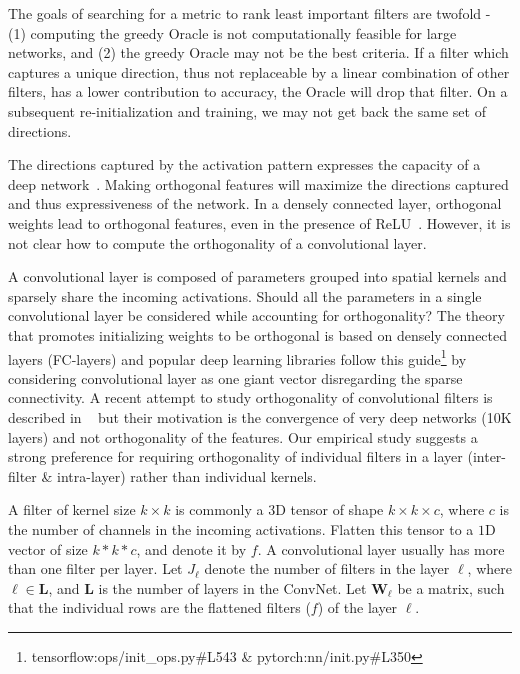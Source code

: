 The goals of searching for a metric to rank least important filters are twofold - (1) computing the greedy Oracle is not computationally feasible for large networks, and (2) the greedy Oracle may not be the best criteria. If a filter which captures a unique direction, thus not replaceable by a linear combination of other filters, has a lower contribution to accuracy, the Oracle will drop that filter. On a subsequent re-initialization and training, we may not get back the same set of directions.

The directions captured by the activation pattern expresses the capacity of a deep network~\cite{Raghu2017OnTE}. 
Making orthogonal features will maximize the directions captured and thus expressiveness of the network.
In a densely connected layer, orthogonal weights lead to orthogonal features, even in the presence of ReLU~\cite{Vorontsov2017OnOA}.
However, it is not clear how to compute the orthogonality of a convolutional layer. 

A convolutional layer is composed of parameters grouped into spatial kernels and sparsely share the incoming activations.
Should all the parameters in a single convolutional layer be considered while accounting for orthogonality?
The theory that promotes initializing weights to be orthogonal is based on densely connected layers (FC-layers) and popular deep learning libraries follow this guide\footnote{tensorflow:ops/init\_ops.py\#L543 \& pytorch:nn/init.py\#L350} by considering convolutional layer as one giant vector disregarding the sparse connectivity.
A recent attempt to study orthogonality of convolutional filters is described in ~\cite{Xiao2018DynamicalIA} but their motivation is the convergence of very deep networks (10K layers) and not orthogonality of the features.
Our empirical study suggests a strong preference for requiring orthogonality of individual filters in a layer (inter-filter \& intra-layer) rather than individual kernels.


A filter of kernel size $k\times k$ is commonly a $3$D tensor of shape $k \times k \times c$, where $c$ is the number of channels in the incoming activations.
Flatten this tensor to a $1$D vector of size $k*k*c$, and denote it by $f$.
A convolutional layer usually has more than one filter per layer. 
Let $J_\ell$ denote the number of filters in the layer $\ell$, where $\ell \in \mathbf{L}$, and $\mathbf{L}$ is the number of layers in the ConvNet.
Let $\boldsymbol{W}_\ell$ be a matrix, such that the individual rows are the flattened filters ($f$) of the layer $\ell$.

